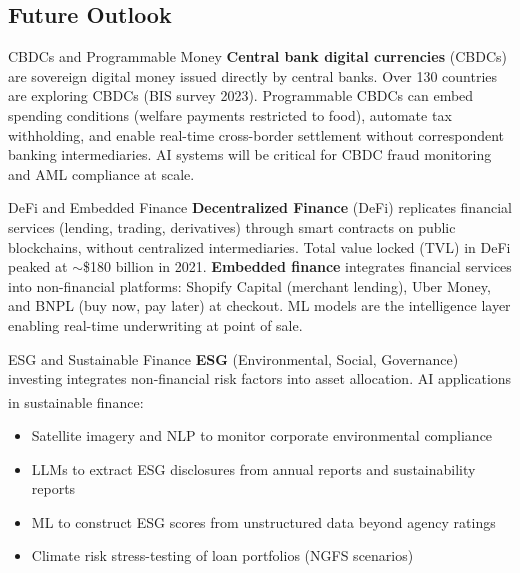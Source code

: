\subsection{Future Outlook}


\begin{v3topic}{CBDCs and Programmable Money}
    \textbf{Central bank digital currencies} (CBDCs) are sovereign digital money issued directly by central banks.
    Over 130 countries are exploring CBDCs (BIS survey 2023).
    Programmable CBDCs can embed spending conditions (welfare payments restricted to food), automate tax withholding, and enable real-time cross-border settlement without correspondent banking intermediaries.
    AI systems will be critical for CBDC fraud monitoring and AML compliance at scale.

\end{v3topic}
\begin{v3topic}{DeFi and Embedded Finance}
    \textbf{Decentralized Finance} (DeFi) replicates financial services (lending, trading, derivatives) through smart contracts on public blockchains, without centralized intermediaries.
    Total value locked (TVL) in DeFi peaked at $\sim$\$180 billion in 2021.
    \textbf{Embedded finance} integrates financial services into non-financial platforms: Shopify Capital (merchant lending), Uber Money, and BNPL (buy now, pay later) at checkout.
    ML models are the intelligence layer enabling real-time underwriting at point of sale.

\end{v3topic}
\begin{v3topic}{ESG and Sustainable Finance}
    \textbf{ESG} (Environmental, Social, Governance) investing integrates non-financial risk factors into asset allocation.
    AI applications in sustainable finance\textsuperscript{\cite[][p.~715]{jansenMachineLearningAlgorithmic2020}}:
\visualseparator
    \begin{itemize}
        \item Satellite imagery and NLP to monitor corporate environmental compliance
        \item LLMs to extract ESG disclosures from annual reports and sustainability reports
        \item ML to construct ESG scores from unstructured data beyond agency ratings
        \item Climate risk stress-testing of loan portfolios (NGFS scenarios)
    \end{itemize}

\end{v3topic}

